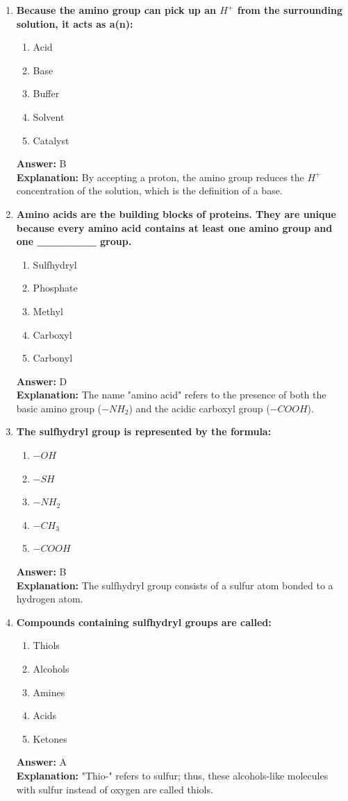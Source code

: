 \documentclass[11pt, a4paper]{article}
\begin{document}
\begin{enumerate}
\item \textbf{Because the amino group can pick up an $H^+$ from the surrounding solution, it acts as a(n):}
\begin{enumerate}[label=\Alph*.]
    \item Acid
    \item Base
    \item Buffer
    \item Solvent
    \item Catalyst
\end{enumerate}
\textbf{Answer:} B \\
\textbf{Explanation:} By accepting a proton, the amino group reduces the $H^+$ concentration of the solution, which is the definition of a base.

\item \textbf{Amino acids are the building blocks of proteins. They are unique because every amino acid contains at least one amino group and one \_\_\_\_\_\_\_ group.}
\begin{enumerate}[label=\Alph*.]
    \item Sulfhydryl
    \item Phosphate
    \item Methyl
    \item Carboxyl
    \item Carbonyl
\end{enumerate}
\textbf{Answer:} D \\
\textbf{Explanation:} The name "amino acid" refers to the presence of both the basic amino group ($-NH_2$) and the acidic carboxyl group ($-COOH$).

\item \textbf{The sulfhydryl group is represented by the formula:}
\begin{enumerate}[label=\Alph*.]
    \item $-OH$
    \item $-SH$
    \item $-NH_2$
    \item $-CH_3$
    \item $-COOH$
\end{enumerate}
\textbf{Answer:} B \\
\textbf{Explanation:} The sulfhydryl group consists of a sulfur atom bonded to a hydrogen atom.

\item \textbf{Compounds containing sulfhydryl groups are called:}
\begin{enumerate}[label=\Alph*.]
    \item Thiols
    \item Alcohols
    \item Amines
    \item Acids
    \item Ketones
\end{enumerate}
\textbf{Answer:} A \\
\textbf{Explanation:} "Thio-" refers to sulfur; thus, these alcohols-like molecules with sulfur instead of oxygen are called thiols.


\end{enumerate}
\end{document}
